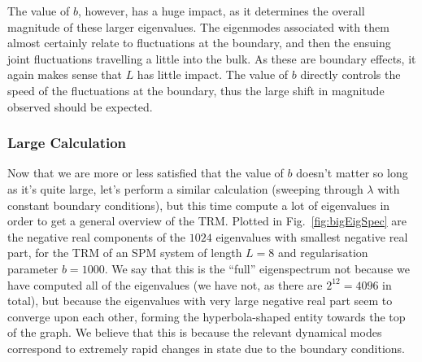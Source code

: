 The value of $b$, however, has a huge impact, as it determines the overall magnitude
of these larger eigenvalues. The eigenmodes associated with them almost certainly
relate to fluctuations at the boundary, and then the ensuing joint fluctuations 
travelling a little into the bulk. As these are boundary effects, it again makes sense
that $L$ has little impact. The value of $b$ directly controls the speed of the 
fluctuations at the boundary, thus the large shift in magnitude observed should be 
expected.

\subsubsection{Large Calculation}
Now that we are more or less satisfied that the value of $b$ doesn't matter so long as
it's quite large, let's perform a similar calculation (sweeping through $\lambda$ with
constant boundary conditions), but this time compute a lot of eigenvalues in order to
get a general overview of the TRM. 
Plotted in Fig.~\ref{fig:bigEigSpec} are the negative real components of the $1024$ eigenvalues with smallest negative
 real part, for the TRM of an SPM system of length $L=8$ and regularisation parameter 
 $b=1000$. We say that this is the ``full'' eigenspectrum not because
 we have computed all of the eigenvalues (we have not, as there are $2^{12} = 4096$ in
 total), but because the eigenvalues with very large negative real part seem to converge
 upon each other, forming the hyperbola-shaped entity towards the top of the graph.
 We believe that this is because the relevant dynamical modes correspond to extremely
 rapid changes in state due to the boundary conditions.
 
